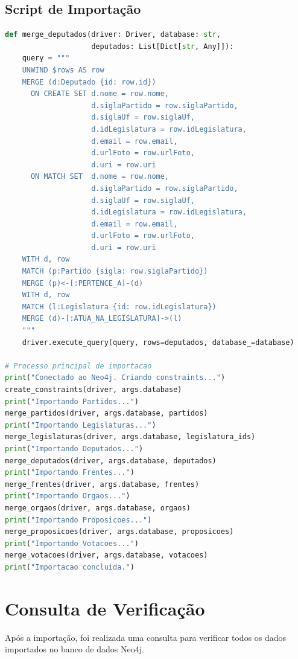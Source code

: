 \documentclass[12pt,a4paper]{article}
\begin{document}
\subsection{Script de Importação}

\begin{lstlisting}[language=Python,caption=Trecho principal do script de importação (import\_neo4j.py)]
def merge_deputados(driver: Driver, database: str, 
                    deputados: List[Dict[str, Any]]):
    query = """
    UNWIND $rows AS row
    MERGE (d:Deputado {id: row.id})
      ON CREATE SET d.nome = row.nome,
                    d.siglaPartido = row.siglaPartido,
                    d.siglaUf = row.siglaUf,
                    d.idLegislatura = row.idLegislatura,
                    d.email = row.email,
                    d.urlFoto = row.urlFoto,
                    d.uri = row.uri
      ON MATCH SET  d.nome = row.nome,
                    d.siglaPartido = row.siglaPartido,
                    d.siglaUf = row.siglaUf,
                    d.idLegislatura = row.idLegislatura,
                    d.email = row.email,
                    d.urlFoto = row.urlFoto,
                    d.uri = row.uri
    WITH d, row
    MATCH (p:Partido {sigla: row.siglaPartido})
    MERGE (p)<-[:PERTENCE_A]-(d)
    WITH d, row
    MATCH (l:Legislatura {id: row.idLegislatura})
    MERGE (d)-[:ATUA_NA_LEGISLATURA]->(l)
    """
    driver.execute_query(query, rows=deputados, database_=database)

# Processo principal de importacao
print("Conectado ao Neo4j. Criando constraints...")
create_constraints(driver, args.database)
print("Importando Partidos...")
merge_partidos(driver, args.database, partidos)
print("Importando Legislaturas...")
merge_legislaturas(driver, args.database, legislatura_ids)
print("Importando Deputados...")
merge_deputados(driver, args.database, deputados)
print("Importando Frentes...")
merge_frentes(driver, args.database, frentes)
print("Importando Orgaos...")
merge_orgaos(driver, args.database, orgaos)
print("Importando Proposicoes...")
merge_proposicoes(driver, args.database, proposicoes)
print("Importando Votacoes...")
merge_votacoes(driver, args.database, votacoes)
print("Importacao concluida.")
\end{lstlisting}

\section{Consulta de Verificação}

Após a importação, foi realizada uma consulta para verificar todos os dados importados no banco de dados Neo4j.
\end{document}
